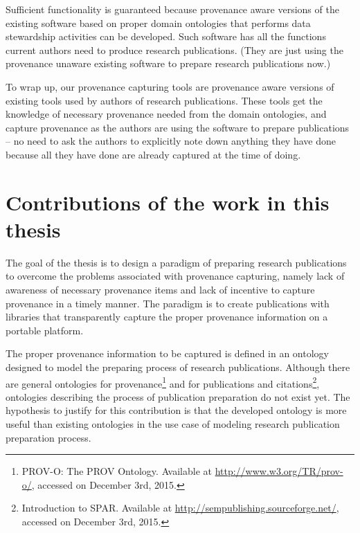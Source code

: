 Sufficient functionality is guaranteed because provenance aware versions of the existing software based on proper domain ontologies that performs data stewardship activities can be developed. Such software has all the functions current authors need to produce research publications. (They are just using the provenance unaware existing software to prepare research publications now.) 

To wrap up, our provenance capturing tools are provenance aware versions of existing tools used by authors of research publications. These tools get the knowledge of necessary provenance needed from the domain ontologies, and capture provenance as the authors are using the software to prepare publications -- no need to ask the authors to explicitly note down anything they have done because all they have done are already captured at the time of doing.

\section{Contributions of the work in this thesis}
\label{sec:contribution}
The goal of the thesis is to design a paradigm of preparing research publications to overcome the problems associated with provenance capturing, namely lack of awareness of necessary provenance items and lack of incentive to capture provenance in a timely manner. The paradigm is to create publications with libraries that transparently capture the proper provenance information on a portable platform.

The proper provenance information to be captured is defined in an ontology designed to model the preparing process of research publications. Although there are general ontologies for provenance\footnote{PROV-O: The PROV Ontology. Available at \url{http://www.w3.org/TR/prov-o/}, accessed on December 3rd, 2015.} and for publications and citations\footnote{Introduction to SPAR. Available at \url{http://sempublishing.sourceforge.net/}, accessed on December 3rd, 2015.}, ontologies describing the process of publication preparation do not exist yet. The hypothesis to justify for this contribution is that the developed ontology is more useful than existing ontologies in the use case of modeling research publication preparation process.

